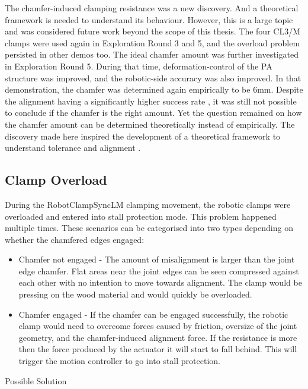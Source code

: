 The chamfer-induced clamping resistance was a new discovery. And a theoretical framework is needed to understand its behaviour. However, this is a large topic and was considered future work beyond the scope of this thesis. The four CL3/M clamps were used again in Exploration Round 3 and 5, and the overload problem persisted in other demos too. 
The ideal chamfer amount was further investigated in Exploration Round 5. During that time, deformation-control of the PA structure was improved, and the robotic-side accuracy was also improved. In that demonstration, the chamfer was determined again empirically to be 6mm. Despite the alignment having a significantly higher success rate , it was still not possible to conclude if the chamfer is the right amount.
Yet the question remained on how the chamfer amount can be determined theoretically instead of empirically. The discovery made here inspired the development of a theoretical framework to understand tolerance and alignment .

\subsection{Clamp Overload}
\label{subsection:exploration-2-clamp-overload}

During the RobotClampSyncLM clamping movement, the robotic clamps were overloaded and entered into stall protection mode. This problem happened multiple times. These scenarios can be categorised into two types depending on whether the chamfered edges engaged:
\begin{itemize}
    \item Chamfer not engaged - The amount of misalignment is larger than the joint edge chamfer. Flat areas near the joint edges can be seen compressed against each other with no intention to move towards alignment. The clamp would be pressing on the wood material and would quickly be overloaded.
    \item Chamfer engaged - If the chamfer can be engaged successfully, the robotic clamp would need to overcome forces caused by friction, oversize of the joint geometry, and the chamfer-induced alignment force. If the resistance is more then the force produced by the actuator it will start to fall behind. This will trigger the motion controller to go into stall protection.
\end{itemize}

Possible Solution

